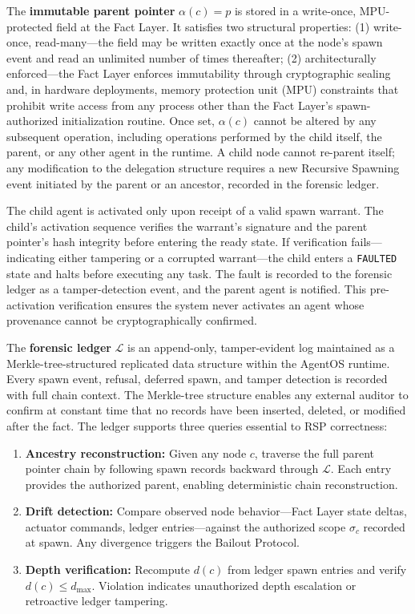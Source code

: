 The \textbf{immutable parent pointer} $\alpha(c) = p$ is stored in a write-once, MPU-protected field at the Fact Layer. It satisfies two structural properties: (1) write-once, read-many---the field may be written exactly once at the node's spawn event and read an unlimited number of times thereafter; (2) architecturally enforced---the Fact Layer enforces immutability through cryptographic sealing and, in hardware deployments, memory protection unit (MPU) constraints that prohibit write access from any process other than the Fact Layer's spawn-authorized initialization routine. Once set, $\alpha(c)$ cannot be altered by any subsequent operation, including operations performed by the child itself, the parent, or any other agent in the runtime. A child node cannot re-parent itself; any modification to the delegation structure requires a new Recursive Spawning event initiated by the parent or an ancestor, recorded in the forensic ledger.

The child agent is activated only upon receipt of a valid spawn warrant. The child's activation sequence verifies the warrant's signature and the parent pointer's hash integrity before entering the ready state. If verification fails---indicating either tampering or a corrupted warrant---the child enters a \texttt{FAULTED} state and halts before executing any task. The fault is recorded to the forensic ledger as a tamper-detection event, and the parent agent is notified. This pre-activation verification ensures the system never activates an agent whose provenance cannot be cryptographically confirmed.

The \textbf{forensic ledger} $\mathcal{L}$ is an append-only, tamper-evident log maintained as a Merkle-tree-structured replicated data structure within the AgentOS runtime. Every spawn event, refusal, deferred spawn, and tamper detection is recorded with full chain context. The Merkle-tree structure enables any external auditor to confirm at constant time that no records have been inserted, deleted, or modified after the fact. The ledger supports three queries essential to RSP correctness:

\begin{enumerate}
    \itemsep0em
    \item \textbf{Ancestry reconstruction:} Given any node $c$, traverse the full parent pointer chain by following spawn records backward through $\mathcal{L}$. Each entry provides the authorized parent, enabling deterministic chain reconstruction.
    \item \textbf{Drift detection:} Compare observed node behavior---Fact Layer state deltas, actuator commands, ledger entries---against the authorized scope $\sigma_c$ recorded at spawn. Any divergence triggers the Bailout Protocol.
    \item \textbf{Depth verification:} Recompute $d(c)$ from ledger spawn entries and verify $d(c) \leq d_{\max}$. Violation indicates unauthorized depth escalation or retroactive ledger tampering.
\end{enumerate}


